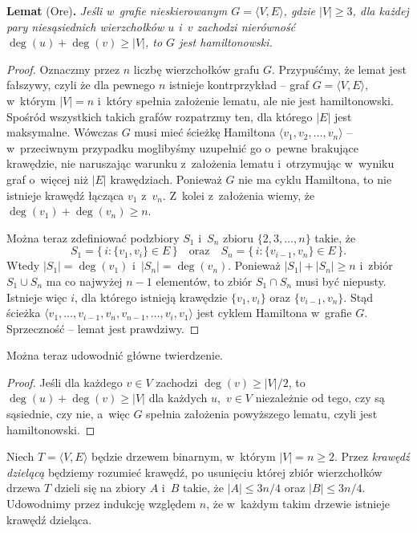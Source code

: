 \medskip
\noindent\textsf{\textbf{Lemat} (Ore)\textbf{.}} \textit{Jeśli w~grafie nieskierowanym\/ $G=\langle V,E\rangle$, gdzie\/ $|V|\ge3$, dla każdej pary niesąsiednich wierzchołków\/ $u$ i~\/$v$ zachodzi nierówność\/ $\deg(u)+\deg(v)\ge|V|$, to\/ $G$ jest hamiltonowski.}
\begin{proof}
Oznaczmy przez $n$ liczbę wierzchołków grafu $G$. Przypuśćmy, że lemat jest fałszywy, czyli że dla pewnego $n$ istnieje kontrprzykład -- graf $G=\langle V,E\rangle$, w~którym $|V|=n$ i~który spełnia założenie lematu, ale nie jest hamiltonowski. Spośród wszystkich takich grafów rozpatrzmy ten, dla którego $|E|$ jest maksymalne. Wówczas $G$ musi mieć ścieżkę Hamiltona $\langle v_1,v_2,\dots,v_n\rangle$ -- w~przeciwnym przypadku moglibyśmy uzupełnić go o~pewne brakujące krawędzie, nie naruszając warunku z~założenia lematu i~otrzymując w~wyniku graf o~więcej niż $|E|$ krawędziach. Ponieważ $G$ nie ma cyklu Hamiltona, to nie istnieje krawędź łącząca $v_1$ z~$v_n$. Z~kolei z~założenia wiemy, że $\deg(v_1)+\deg(v_n)\ge n$.

Można teraz zdefiniować podzbiory $S_1$ i~$S_n$ zbioru $\{2,3,\dots,n\}$ takie, że
\[
	S_1 = \bigl\{\,i:\{v_1,v_i\}\in E\,\bigr\} \quad\text{oraz}\quad S_n = \bigl\{\,i:\{v_{i-1},v_n\}\in E\,\bigr\}.
\]
Wtedy $|S_1|=\deg(v_1)$ i~$|S_n|=\deg(v_n)$. Ponieważ $|S_1|+|S_n|\ge n$ i~zbiór $S_1\cup S_n$ ma co najwyżej $n-1$ elementów, to zbiór $S_1\cap S_n$ musi być niepusty. Istnieje więc $i$, dla którego istnieją krawędzie $\{v_1,v_i\}$ oraz $\{v_{i-1},v_n\}$. Stąd ścieżka $\langle v_1,\dots,v_{i-1},v_n,v_{n-1},\dots,v_i,v_1\rangle$ jest cyklem Hamiltona w~grafie $G$. Sprzeczność -- lemat jest prawdziwy.
\end{proof}

Można teraz udowodnić główne twierdzenie.
\begin{proof}
Jeśli dla każdego $v\in V$ zachodzi $\deg(v)\ge|V|/2$, to $\deg(u)+\deg(v)\ge|V|$ dla każdych $u$,~$v\in V$ niezależnie od tego, czy są sąsiednie, czy nie, a~więc $G$ spełnia założenia powyższego lematu, czyli jest hamiltonowski.
\end{proof}


\subproblem %
Niech $T=\langle V,E\rangle$ będzie drzewem binarnym, w~którym $|V|=n\ge2$. Przez \emph{krawędź dzielącą} będziemy rozumieć krawędź, po usunięciu której zbiór wierzchołków drzewa $T$ dzieli się na zbiory $A$ i~$B$ takie, że $|A|\le3n/4$ oraz $|B|\le3n/4$. Udowodnimy przez indukcję względem $n$, że w~każdym takim drzewie istnieje krawędź dzieląca.


